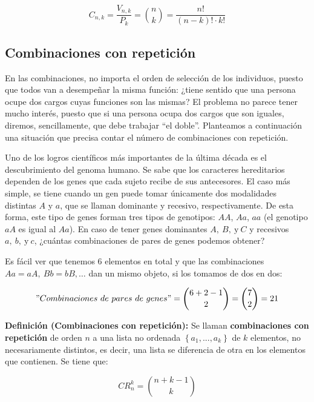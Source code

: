 \documentclass[12pt]{article}
\theoremstyle{definition}
\theoremstyle{plain}
\theoremstyle{plain}
\theoremstyle{definition}
\begin{document}
        \begin{equation*}
            C_{n,k} = \frac{V_{n,k}}{P_k} = \binom{n}{k} = \frac{n!}{(n-k)! \cdot k!}
        \end{equation*}

    \subsection{Combinaciones con repetición}

        En las combinaciones, no importa el orden de selección de los individuos, puesto que todos van a desempeñar la misma función: ¿tiene sentido que una persona ocupe dos cargos cuyas funciones son las mismas? El problema no parece tener mucho interés, puesto que si una persona ocupa dos cargos que son iguales, diremos, sencillamente, que debe trabajar ``el doble''. Planteamos a continuación una situación que precisa contar el número de combinaciones con repetición.

        Uno de los logros científicos más importantes de la última década es el descubrimiento del genoma humano. Se sabe que los caracteres hereditarios dependen de los genes que cada sujeto recibe de sus antecesores. El caso más simple, se tiene cuando un gen puede tomar únicamente dos modalidades distintas $A$ y $a$, que se llaman dominante y recesivo, respectivamente. De esta forma, este tipo de genes forman tres tipos de genotipos: $AA$, $Aa$, $aa$ (el genotipo $aA$ es igual al $Aa$). En caso de tener genes dominantes \(A,\ B,\ \text{y}\ C\) y recesivos \(a,\ b,\ \text{y}\ c\), ¿cuántas combinaciones de pares de genes podemos obtener?

        Es fácil ver que tenemos 6 elementos en total y que las combinaciones \(Aa = aA,\ Bb = bB,\dots\) dan un mismo objeto, si los tomamos de dos en dos:

        \begin{equation*}
            "Combinaciones\ de\ pares\ de\ genes" = \binom{6 + 2 - 1}{2} = \binom{7}{2} = 21
        \end{equation*}

        \textbf{Definición (Combinaciones con repetición):}
        Se llaman \textbf{combinaciones con repetición} de  orden \(n\) a una lista no ordenada \(\left\{a_1,...,a_k\right\}\) de \(k\) elementos, no necesariamente distintos, es decir, una lista se diferencia de otra en los elementos que contienen. Se tiene que:

        \begin{equation*}
            CR_n^k = \binom{n+k-1}{k}
        \end{equation*}
\end{document}
